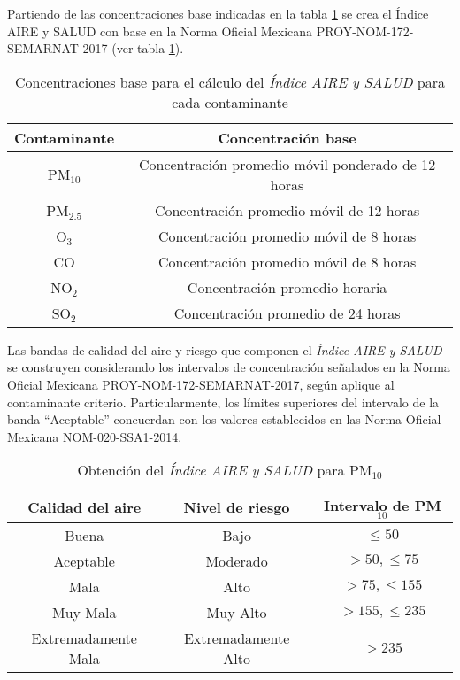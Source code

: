 Partiendo de las concentraciones base indicadas en la tabla \ref{base} se crea el Índice {\sc AIRE} y {\sc SALUD} con base en la Norma Oficial Mexicana  PROY-NOM-172-SEMARNAT-2017 (ver tabla \ref{base}).

\begin{table}[H]
\centering
\caption{Concentraciones base para el cálculo del { \em Índice AIRE y SALUD} para cada contaminante}
\begin{adjustbox}{max width=0.9\textwidth}
\begin{tabular}{|c|c|}
\hline
Contaminante &Concentración base\\ \hline
PM$_{10}$ &Concentración promedio móvil ponderado de 12 horas \\
PM$_{2.5}$ &Concentración promedio móvil de 12 horas \\
O$_{3}$ &Concentración promedio móvil de 8 horas \\
CO &Concentración promedio móvil de 8 horas \\
NO$_{2}$ &Concentración promedio horaria \\
SO$_{2}$ &Concentración promedio de 24 horas \\ \hline
\end{tabular}
\end{adjustbox}
\label{base}
\end{table}

Las bandas de calidad del aire y riesgo que componen el {\em Índice AIRE y SALUD} se construyen considerando los intervalos de concentración señalados en la Norma Oficial Mexicana PROY-NOM-172-SEMARNAT-2017, según aplique al contaminante criterio. Particularmente, los límites superiores del intervalo de la banda “Aceptable” concuerdan con los valores establecidos en las Norma Oficial Mexicana NOM-020-SSA1-2014.

\begin{table}[H]
\centering
\caption{Obtención del {\em Índice AIRE y SALUD} para PM$_{10}$}
\begin{adjustbox}{max width=0.9\textwidth}
\begin{tabular}{|c|c|c|}
\hline
Calidad del aire & Nivel de riesgo & Intervalo de PM$_{10}$ \\ \hline
Buena &Bajo &$\leq50$ \\
Aceptable &Moderado &$>50, \leq75$ \\
Mala &Alto &$>75, \leq155$ \\
Muy Mala &Muy Alto &$>155, \leq235$ \\
Extremadamente Mala &Extremadamente Alto &$>235$ \\ \hline
\end{tabular}
\end{adjustbox}
\label{basepm10}
\end{table}

